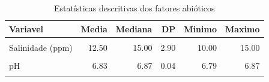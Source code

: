 \begin{table}[!h]
\centering
\caption{\label{tab:tab:descritivas}Estatísticas descritivas dos fatores abióticos}
\centering
\begin{tabular}[t]{lrrrrr}
\toprule
Variavel & Media & Mediana & DP & Minimo & Maximo\\
\midrule
\cellcolor{gray!10}{Índice bioturbação (\%)} & \cellcolor{gray!10}{47.20} & \cellcolor{gray!10}{34.00} & \cellcolor{gray!10}{15.30} & \cellcolor{gray!10}{34.00} & \cellcolor{gray!10}{60.00}\\
Salinidade (ppm) & 12.50 & 15.00 & 2.90 & 10.00 & 15.00\\
\cellcolor{gray!10}{OD (mg/l)} & \cellcolor{gray!10}{2.32} & \cellcolor{gray!10}{0.41} & \cellcolor{gray!10}{2.10} & \cellcolor{gray!10}{0.41} & \cellcolor{gray!10}{4.23}\\
pH & 6.83 & 6.87 & 0.04 & 6.79 & 6.87\\
\cellcolor{gray!10}{Matéria orgânica (\%)} & \cellcolor{gray!10}{4.45} & \cellcolor{gray!10}{4.24} & \cellcolor{gray!10}{0.21} & \cellcolor{gray!10}{4.24} & \cellcolor{gray!10}{4.66}\\
\bottomrule
\end{tabular}
\end{table}
